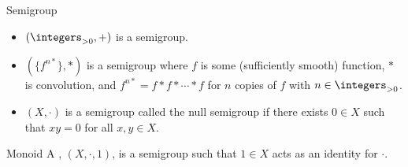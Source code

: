 \begin{exm}{Semigroup}{}
    \begin{itemize}
        \item \((\positiveintegers, +)\) is a semigroup.
    
        \item \((\{f^{n*}\}, *)\) is a semigroup where \(f\) is some (sufficiently smooth) function, \(*\) is convolution, and \(f^{n*} = f*f*\dotsb *f\) for \(n\) copies of \(f\) with \(n \in \positiveintegers\).
        
        \item \((X, \cdot)\) is a semigroup called the null semigroup if there exists \(0 \in X\) such that \(xy = 0\) for all \(x, y \in X\).
    \end{itemize}
\end{exm}

\begin{dfn}{Monoid}{}
    A , \((X, \cdot, 1)\), is a semigroup such that \(1 \in X\) acts as an identity for \(\cdot\).
\end{dfn}

